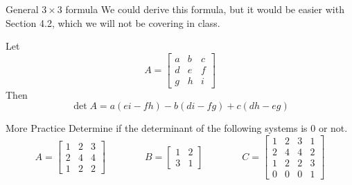 \documentclass[xcoler=dvipsnames, aspectratio=169]{beamer}
\begin{document}
    \iftoggle{showSolutions}{
        \begin{frame}{$a\neq0$ case}
            \begin{proof}
                If $a\neq0$, we just need to eliminate $c$!
                \pause
                \[
                    A = \aMat{cc}{
                        a & b\\
                        c & d
                    }\pause\xrightarrow{R_2 = R_2 - \frac{c}{a}R_1}\aMat{cc}{
                        a & b\\
                        0 & d-\frac{bc}{a}
                    } = B
                \]
                See that $\det{A} = \det{B} = a\left(d-\frac{bc}{a}\right)\pause = ad - bc$.
            \end{proof}
        \end{frame}
    }{}
    \begin{frame}{General $3\times 3$ formula}
        We could derive this formula, but it would be easier with Section 4.2, which we will not 
        be covering in class.\pause
        \begin{theorem}
        Let 
        \[
            A = \begin{bmatrix}
                a & b & c\\
                d & e & f\\
                g & h & i
            \end{bmatrix}
        \]
        Then
        \[
            \det{A} = a(ei-fh) - b(di-fg) + c(dh-eg)
        \]
        \end{theorem}
    \end{frame}
    \begin{frame}{More Practice} 
        Determine if the determinant of the following systems is $0$ or not.
        \[
            A = \begin{bmatrix}
                1 & 2 & 3\\
                2 & 4 & 4\\
                1 & 2 & 2
            \end{bmatrix}\qquad\qquad B = \begin{bmatrix}
                1 & 2\\
                3 & 1
            \end{bmatrix}\qquad\qquad C = \begin{bmatrix}
                1 & 2 & 3 & 1\\
                2 & 4 & 4 & 2\\
                1 & 2 & 2 & 3\\
                0 & 0 & 0 & 1
            \end{bmatrix}
        \]
        \vspace{130pt}
    \end{frame}
\end{document}
